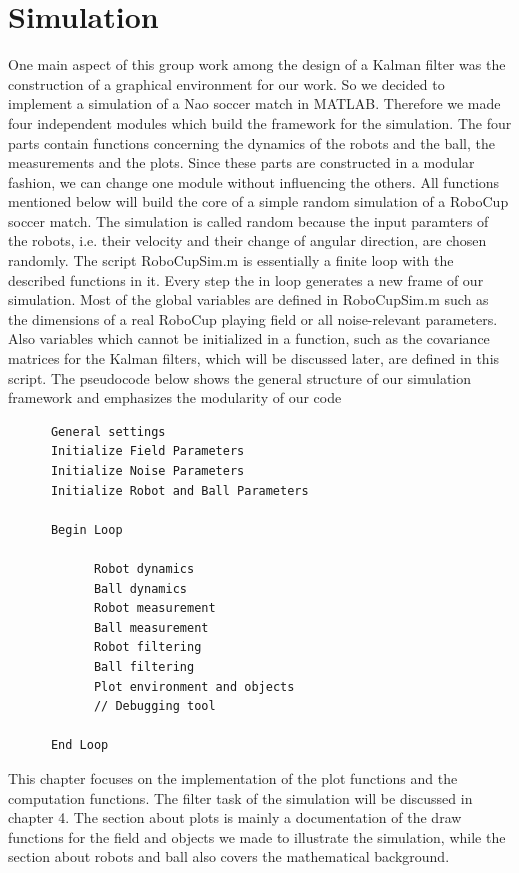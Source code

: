 
\chapter{Simulation}

One main aspect of this group work among the design of a Kalman filter was the construction of a graphical environment for our work. So we decided to implement a simulation of a Nao soccer match in MATLAB. Therefore we made four independent modules which build the framework for the simulation. The four parts contain functions concerning the dynamics of the robots and the ball, the measurements and the plots. Since these parts are constructed in a modular fashion, we can change one module without influencing the others. All functions mentioned below will build the core of a simple random simulation of a RoboCup soccer match. The simulation is called random because the input paramters of the robots, i.e. their velocity and their change of angular direction, are chosen randomly. The script {\selectfont RoboCupSim.m} is essentially a finite loop with the described functions in it. Every step the in loop generates a new frame of our simulation. Most of the global variables are defined in {\selectfont RoboCupSim.m} such as the dimensions of a real RoboCup playing field or all noise-relevant parameters. Also variables which cannot be initialized in a function, such as the covariance matrices for the Kalman filters, which will be discussed later, are defined in this script. The pseudocode below shows the general structure of our simulation framework and emphasizes the modularity of our code

\begin{verbatim}
      General settings
      Initialize Field Parameters
      Initialize Noise Parameters
      Initialize Robot and Ball Parameters

      Begin Loop
	
            Robot dynamics
            Ball dynamics
            Robot measurement
            Ball measurement
            Robot filtering
            Ball filtering
            Plot environment and objects
            // Debugging tool
	
      End Loop
\end{verbatim}

This chapter focuses on the implementation of the plot functions and the computation functions. The filter task of the simulation will be discussed in chapter 4.
The section about plots is mainly a documentation of the draw functions for the field and objects we made to illustrate the simulation, while the section about robots and ball also covers the mathematical background.

